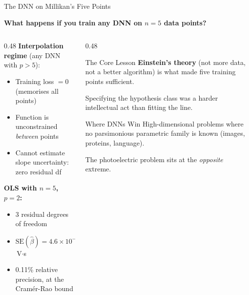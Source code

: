 \documentclass[aspectratio=169,12pt]{beamer}
\begin{document}
\begin{frame}[shrink=8]{The DNN on Millikan's Five Points}

\textbf{What happens if you train any DNN on $n = 5$ data points?}

\bigskip
\begin{columns}[T]
\begin{column}{0.48\textwidth}
\textbf{Interpolation regime} (any DNN with $p > 5$):
\begin{itemize}
  \item Training loss $= 0$ (memorises all points)
  \item Function is unconstrained \emph{between} points
  \item Cannot estimate slope uncertainty: zero residual df
\end{itemize}

\bigskip
\textbf{OLS with $n=5$, $p=2$:}
\begin{itemize}
  \item 3 residual degrees of freedom
  \item $\mathrm{SE}(\hat\beta) = 4.6\times10^{-18}$\,V$\cdot$s
  \item 0.11\% relative precision, at the Cram\'er-Rao bound
\end{itemize}
\end{column}
\begin{column}{0.48\textwidth}
\begin{alertblock}{The Core Lesson}
\textbf{Einstein's theory} (not more data,
not a better algorithm) is what made
five training points sufficient.

\bigskip
Specifying the hypothesis class was a
harder intellectual act than fitting
the line.
\end{alertblock}

\bigskip
\begin{block}{Where DNNs Win}
High-dimensional problems where no
parsimonious parametric family is known
(images, proteins, language).

\smallskip
The photoelectric problem sits at the
\emph{opposite} extreme.
\end{block}
\end{column}
\end{columns}

\end{frame}
\end{document}
